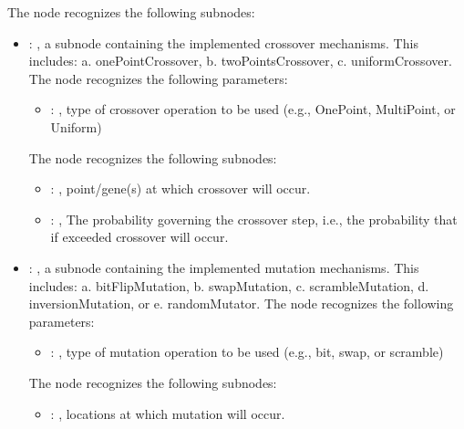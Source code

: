 \begin{itemize}
\begin{itemize}
          The  node recognizes the following subnodes:
          \begin{itemize}
            \item {}: , 
              a subnode containing the implemented crossover mechanisms.                   This
              includes: a.    onePointCrossover,                                  b.
              twoPointsCrossover,                                  c.    uniformCrossover.
              The  node recognizes the following parameters:
                \begin{itemize}
                  \item {}: , 
                    type of crossover operation to be used (e.g., OnePoint, MultiPoint, or Uniform)
              \end{itemize}

              The  node recognizes the following subnodes:
              \begin{itemize}
                \item {}: , 
                  point/gene(s) at which crossover will occur.

                \item {}: , 
                  The probability governing the crossover step, i.e., the probability that if
                  exceeded crossover will occur.
              \end{itemize}

            \item {}: , 
              a subnode containing the implemented mutation mechanisms.                   This
              includes: a.    bitFlipMutation,                                  b.    swapMutation,
              c.    scrambleMutation,                                  d.    inversionMutation, or
              e.    randomMutator.
              The  node recognizes the following parameters:
                \begin{itemize}
                  \item {}: , 
                    type of mutation operation to be used (e.g., bit, swap, or scramble)
              \end{itemize}

              The  node recognizes the following subnodes:
              \begin{itemize}
                \item {}: , 
                  locations at which mutation will occur.


\end{itemize}
\end{itemize}
\end{itemize}
\end{itemize}
